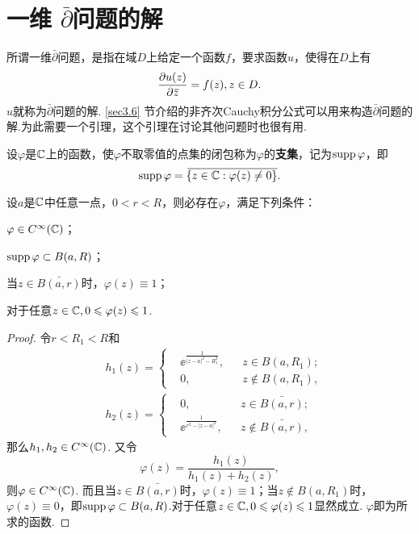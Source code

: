 \section{一维 \texorpdfstring{$\bar \partial$}{∂̅}问题的解}
所谓一维$\bar\partial$问题，是指在域$D$上给定一个函数$f$，要求函数$u$，使得在$D$上有
\[
  \frac{\partial u(z)}{\partial {}\mkern2mu\overline{\mkern-2muz}} = f(z),z\in D.
\]
$u$就称为$\bar\partial$问题的解. \ref{sec3.6} 节介绍的非齐次Cauchy积分公式可以用来构造$\bar\partial$问题的解.为此需要一个引理，这个引理在讨论其他问题时也很有用.
\begin{definition}\label{def3.7.1}
  设$\varphi$是$\mathbb C$上的函数，使$\varphi$不取零值的点集的闭包称为$\varphi$的\textbf{支集}，记为$\operatorname{supp}\varphi$，即
  \[
    \operatorname{supp}\varphi = {}\mkern2mu\overline{\mkern-2mu\{z\in\mathbb C:\varphi(z)\ne0\}}.
  \]
\end{definition}
\begin{lemma}\label{lemma3.7.2}
  设$a$是$\mathbb C$中任意一点，$0<r<R$，则必存在$\varphi$，满足下列条件：
  \begin{eenum}
    \item $\varphi\in C^{\infty}(\mathbb C)$；
    \item $\operatorname{supp}\varphi\subset B(a,R)$；
    \item 当$z\in\bar{B(a,r)}$时，$\varphi(z)\equiv1$；
    \item 对于任意$z\in\mathbb C,0\leqslant\varphi(z)\leqslant1$.
  \end{eenum}
\end{lemma}
\begin{proof}
  令$r<R_1<R$和
  \begin{align*}
    & h_1(z) = \left\{\begin{aligned}
    & \ee^{\frac1{|z-a|^2-R_1^2}}, & & z\in B(a,R_1);\\
    & 0,& & z\notin B(a,R_1),
      \end{aligned}\right.\\
    & h_2(z) = \left\{\begin{aligned}
    & 0,& & z\in \bar{B(a,r)};\\
    & \ee^{\frac1{r^2-|z-a|^2}}, & & z\notin\bar{B(a,r)},
    \end{aligned}\right.
  \end{align*}
  那么$h_1,h_2\in C^\infty(\mathbb C)$. 又令
  \[
    \varphi(z) = \frac{h_1(z)}{h_1(z)+h_2(z)},
  \]
  则$\varphi\in C^\infty(\mathbb C)$. 而且当$z\in \bar{B(a,r)}$时，$\varphi(z)\equiv1$；当$z\notin B(a,R_1)$时，$\varphi(z)\equiv0$，即$\operatorname{supp}\varphi\subset B(a,R)$.对于任意$z\in\mathbb C,0\leqslant\varphi(z)\leqslant1$显然成立. $\varphi$即为所求的函数.
\end{proof}

